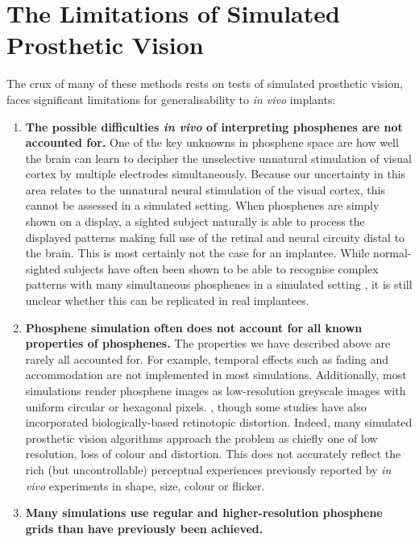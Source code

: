 \documentclass[a4paper,11pt,openany]{book}
\begin{document}
\section*{The Limitations of Simulated Prosthetic Vision}
\label{sec:org4888e6d}

The crux of many of these methods rests on tests of simulated prosthetic vision, faces significant limitations for generalisability to \emph{in vivo} implants:

\begin{enumerate}
\item \textbf{The possible difficulties \emph{in vivo} of interpreting phosphenes are not accounted for.}
One of the key unknowns in phosphene space are how well the brain can learn to decipher the unselective unnatural stimulation of visual cortex by multiple electrodes simultaneously. \cite{beyeler_learning_2017}
Because our uncertainty in this area relates to the unnatural neural stimulation of the visual cortex, this cannot be assessed in a simulated setting.
When phosphenes are simply shown on a display, a sighted subject naturally is able to process the displayed patterns making full use of the retinal and neural circuity distal to the brain.
This is most certainly not the case for an implantee.
While normal-sighted subjects have often been shown to be able to recognise complex patterns with many simultaneous phosphenes in a simulated setting \cite{chen_simulating_2009}, it is still unclear whether this can be replicated in real implantees.
\item \textbf{Phosphene simulation often does not account for all known properties of phosphenes.}
The properties we have described above are rarely all accounted for.
For example, temporal effects such as fading and accommodation are not implemented in most simulations.
Additionally, most simulations render phosphene images as low-resolution greyscale images with uniform circular \cite{mccarthy_mobility_2014,hu_recognition_2014,sanchez-garcia_structural_2018,li_image_2018} or hexagonal pixels. \cite{chen_effect_2004}, though some studies have also incorporated biologically-based retinotopic distortion. \cite{josh_real-time_2011,josh_psychophysics_2013}
Indeed, many simulated prosthetic vision algorithms approach the problem as chiefly one of low resolution, loss of colour and distortion.
This does not accurately reflect the rich (but uncontrollable) perceptual experiences previously reported by \emph{in vivo} experiments in shape, size, colour or flicker.
\item \textbf{Many simulations use regular and higher-resolution phosphene grids than have previously been achieved.}

\end{enumerate}
\end{document}
